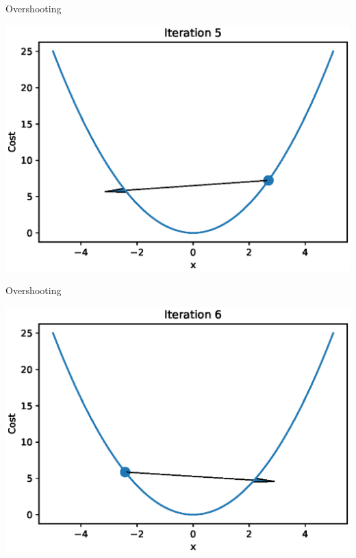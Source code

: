 \documentclass{beamer}
\begin{document}
\begin{frame}{Overshooting}
  \begin{center}
       \includegraphics[totalheight=6cm]{gradient-descent/overshooting-5.eps}
   \end{center}
\end{frame}

\begin{frame}{Overshooting}
  \begin{center}
       \includegraphics[totalheight=6cm]{gradient-descent/overshooting-6.eps}
   \end{center}
\end{frame}
\end{document}
